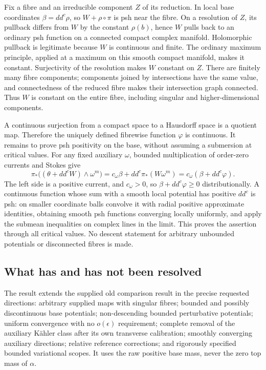\documentclass[
  11pt,
]{article}
\begin{document}
Fix a fibre and an irreducible component \(Z\) of its reduction. In
local base coordinates \(\beta=dd^c\rho\), so \(W+\rho\circ\pi\) is psh
near the fibre. On a resolution of \(Z\), its pullback differs from
\(W\) by the constant \(\rho(b)\), hence \(W\) pulls back to an ordinary
psh function on a connected compact complex manifold. Holomorphic
pullback is legitimate because \(W\) is continuous and finite. The
ordinary maximum principle, applied at a maximum on this smooth compact
manifold, makes it constant. Surjectivity of the resolution makes \(W\)
constant on \(Z\). There are finitely many fibre components; components
joined by intersections have the same value, and connectedness of the
reduced fibre makes their intersection graph connected. Thus \(W\) is
constant on the entire fibre, including singular and higher-dimensional
components.

A continuous surjection from a compact space to a Hausdorff space is a
quotient map. Therefore the uniquely defined fibrewise function
\(\varphi\) is continuous. It remains to prove psh positivity on the
base, without assuming a submersion at critical values. For any fixed
auxiliary \(\omega\), bounded multiplication of order-zero currents and
Stokes give \[\pi_*\big((\theta+dd^cW)\wedge\omega^m\big)
=c_\omega\beta+dd^c\pi_*(W\omega^m)
=c_\omega(\beta+dd^c\varphi).\] The left side is a positive current, and
\(c_\omega>0\), so \(\beta+dd^c\varphi\geq0\) distributionally. A
continuous function whose sum with a smooth local potential has positive
\(dd^c\) is psh: on smaller coordinate balls convolve it with radial
positive approximate identities, obtaining smooth psh functions
converging locally uniformly, and apply the submean inequalities on
complex lines in the limit. This proves the assertion through all
critical values. No descent statement for arbitrary unbounded potentials
or disconnected fibres is made.

\subsection{What has and has not been
resolved}\label{what-has-and-has-not-been-resolved}

The result extends the supplied old comparison result in the precise
requested directions: arbitrary supplied maps with singular fibres;
bounded and possibly discontinuous base potentials; non-descending
bounded perturbative potentials; uniform convergence with no
\(o(\epsilon)\) requirement; complete removal of the auxiliary Kähler
class after its own transverse calibration; smoothly converging
auxiliary directions; relative reference corrections; and rigorously
specified bounded variational scopes. It uses the raw positive base
mass, never the zero top mass of \(\alpha\).
\end{document}
